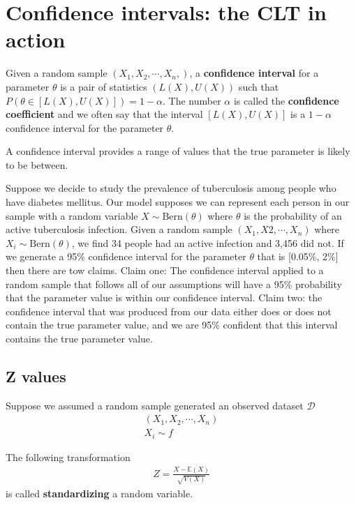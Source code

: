 \section{Confidence intervals: the CLT in action}

Given a random sample $(X_{1},X_{2},\cdots, X_{n},)$, a \textbf{confidence interval} for a parameter $\theta$ is a pair of statistics $(L(X),U(X))$ such that $P( \theta \in [L(X),U(X)] ) = 1 - \alpha$.
The number $\alpha$ is called the \textbf{confidence coefficient} and we often say that the interval $[L(X),U(X)]$ is a $1-\alpha$ confidence interval for the parameter $\theta$. 

A confidence interval provides a range of values that the true parameter is likely to be between.

\ex Suppose we decide to study the prevalence of tuberculosis among people who have diabetes mellitus. Our model supposes we can represent each person in our sample with a random variable $X \sim \text{Bern}(\theta)$ where $\theta$ is the probability of an active tuberculosis infection. Given a random sample  $(X_{1},X{2},\cdots,X_{n})$ where $X_{i} \sim \text{Bern}(\theta)$, we find 34 people had an active infection and 3,456 did not. If we generate a 95\% confidence interval for the parameter $\theta$ that is [0.05\%, 2\%] then there are tow claims. Claim one: The confidence interval applied to a random sample that follows all of our assumptions will have a 95\% probability that the parameter value is within our confidence interval. Claim two: the confidence interval that was produced from our data either does or does not contain the true parameter value, and we are 95\% confident that this interval contains the true parameter value.

\subsection{Z values}

Suppose we assumed a random sample generated an observed dataset $\mathcal{D}$
\begin{align}
    (X_{1},X_{2},\cdots,X_{n}) \\ 
    X_{i} \sim f
\end{align}

The following transformation
\begin{align}
    Z = \frac{X - \mathbb{E}(X)}{ \sqrt{V(X)} }
\end{align}
is called \textbf{standardizing} a random variable.

